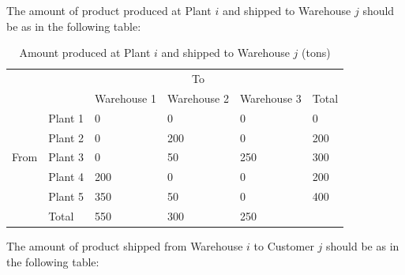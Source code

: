 \documentclass{article}
\begin{document}
The amount of product produced at Plant $i$ and shipped to Warehouse $j$ should be as in the following table:
\begin{table}[!ht]
    \caption{Amount produced at Plant $i$ and shipped to Warehouse $j$ (tons)}
    \centering
    \begin{tabular}{llllll}
        \cline {3-5}
        ~ & \multicolumn{1}{l|}{} & ~ & \multicolumn{1}{c}{To} & \multicolumn{1}{l|}{} & ~ \\ \cline{2-6}
        ~ & \multicolumn{1}{|l|}{} & \multicolumn{1}{l|}{Warehouse 1} & \multicolumn{1}{l|}{Warehouse 2} & \multicolumn{1}{l|}{Warehouse 3} & \multicolumn{1}{l|}{Total} \\ \hline
        \multicolumn{1}{|l|}{} & \multicolumn{1}{l|}{Plant 1} & \multicolumn{1}{l|}{0} & \multicolumn{1}{l|}{0} & \multicolumn{1}{l|}{0} & \multicolumn{1}{l|}{0} \\ \cline{2-6}
        \multicolumn{1}{|l|}{} & \multicolumn{1}{l|}{Plant 2} & \multicolumn{1}{l|}{0} & \multicolumn{1}{l|}{200} & \multicolumn{1}{l|}{0} & \multicolumn{1}{l|}{200} \\ \cline{2-6}
        \multicolumn{1}{|l|}{From} & \multicolumn{1}{l|}{Plant 3} & \multicolumn{1}{l|}{0} & \multicolumn{1}{l|}{50} & \multicolumn{1}{l|}{250} & \multicolumn{1}{l|}{300} \\ \cline{2-6}
        \multicolumn{1}{|l|}{} & \multicolumn{1}{l|}{Plant 4} & \multicolumn{1}{l|}{200} & \multicolumn{1}{l|}{0} & \multicolumn{1}{l|}{0} & \multicolumn{1}{l|}{200} \\ \cline{2-6}
        \multicolumn{1}{|l|}{} & \multicolumn{1}{l|}{Plant 5} & \multicolumn{1}{l|}{350} & \multicolumn{1}{l|}{50} & \multicolumn{1}{l|}{0} & \multicolumn{1}{l|}{400} \\ \hline
        \multicolumn{1}{l|}{} & \multicolumn{1}{l|}{Total} & \multicolumn{1}{l|}{550} & \multicolumn{1}{l|}{300} & \multicolumn{1}{l|}{250} & ~ \\ \cline{2-5}
    \end{tabular}
\end{table}

The amount of product shipped from Warehouse $i$ to Customer $j$ should be as in the following table:
\end{document}
